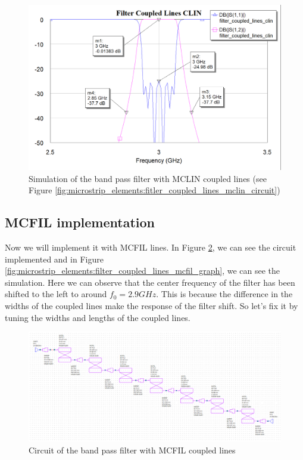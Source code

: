 \documentclass[12pt]{report} %
\begin{document}
\begin{figure}[htbp]
    \centering
    \includegraphics[width=1\linewidth]{images//microstrip_elements/filter_coupled_lines_mclin_graph.png}
    \caption{Simulation of the band pass filter with MCLIN coupled lines (see Figure \ref{fig:microstrip_elements:fitler_coupled_lines_mclin_circuit})}
    \label{fig:microstrip_elements:filter_coupled_lines_mclin_graph}
\end{figure}

\subsection{MCFIL implementation}

Now we will implement it with MCFIL lines. In Figure \ref{fig:microstrip_elements:filter_coupled_lines_mcfil_circuit}, we can see the circuit implemented and in Figure \ref{fig:microstrip_elements:filter_coupled_lines_mcfil_graph}, we can see the simulation. Here we can observe that the center frequency of the filter has been shifted to the left to around $f_0 = 2.9 GHz$. This is because the difference in the widths of the coupled lines make the response of the filter shift. So let's fix it by tuning the widths and lengths of the coupled lines.

\begin{figure}
    \centering
    \includegraphics[width=1\linewidth]{images//microstrip_elements/filter_coupled_lines_mcfil_circuit.png}
    \caption{Circuit of the band pass filter with MCFIL coupled lines}
    \label{fig:microstrip_elements:filter_coupled_lines_mcfil_circuit}
\end{figure}
\end{document}
